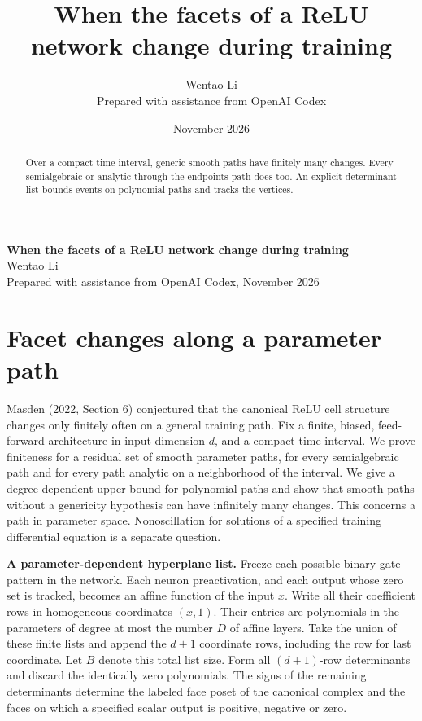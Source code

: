 \documentclass[10pt]{article}
\title{When the facets of a ReLU network change during training}
\author{Wentao Li\\{\small Prepared with assistance from OpenAI Codex}}
\date{November 2026}
\begin{document}
\begin{center}{\Large\bfseries When the facets of a ReLU network change during training}\\[3pt]Wentao Li\\{\small Prepared with assistance from OpenAI Codex, November 2026}\end{center}
\begin{abstract}
Over a compact time interval, generic smooth paths have finitely many changes. Every semialgebraic or analytic-through-the-endpoints path does too. An explicit determinant list bounds events on polynomial paths and tracks the vertices.
\end{abstract}
\section*{Facet changes along a parameter path}
Masden (2022, Section 6) conjectured that the canonical ReLU cell structure changes only finitely often on a general training path. Fix a finite, biased, feed-forward architecture in input dimension $d$, and a compact time interval. We prove finiteness for a residual set of smooth parameter paths, for every semialgebraic path and for every path analytic on a neighborhood of the interval. We give a degree-dependent upper bound for polynomial paths and show that smooth paths without a genericity hypothesis can have infinitely many changes. This concerns a path in parameter space. Nonoscillation for solutions of a specified training differential equation is a separate question.

\textbf{A parameter-dependent hyperplane list.} Freeze each possible binary gate pattern in the network. Each neuron preactivation, and each output whose zero set is tracked, becomes an affine function of the input $x$. Write all their coefficient rows in homogeneous coordinates $(x,1)$. Their entries are polynomials in the parameters of degree at most the number $D$ of affine layers. Take the union of these finite lists and append the $d+1$ coordinate rows, including the row for last coordinate. Let $B$ denote this total list size. Form all $(d+1)$-row determinants and discard the identically zero polynomials. The signs of the remaining determinants determine the labeled face poset of the canonical complex and the faces on which a specified scalar output is positive, negative or zero.
\end{document}
